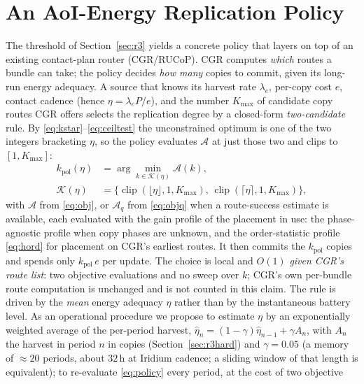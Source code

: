 \documentclass[twocolumn,3p,times,procedia]{elsarticle}
\theoremstyle{plain}
\theoremstyle{remark}
\begin{document}
\section{An AoI-Energy Replication Policy}\label{sec:policy}
The threshold of Section~\ref{sec:r3} yields a concrete policy that layers
on top of an existing contact-plan router (CGR/RUCoP). CGR computes
\emph{which} routes a bundle can take; the policy decides \emph{how many}
copies to commit, given its long-run energy adequacy. A source that knows its
harvest rate $\lambda_e$, per-copy cost $e$, contact cadence (hence
$\eta=\lambda_e P/e$), and the number $K_{\max}$ of candidate copy
routes CGR offers selects the replication degree by a closed-form
\emph{two-candidate} rule. By \eqref{eq:kstar}--\eqref{eq:ceiltest} the
unconstrained optimum is one of the two integers bracketing $\eta$, so the
policy
evaluates $\mathcal{A}$ at just those two and clips to $[1,K_{\max}]$:
\begin{equation}\label{eq:policy}
\begin{aligned}
k_{\mathrm{pol}}(\eta)&=\arg\min_{k\in\mathcal{K}(\eta)}\mathcal{A}(k),\\
\mathcal{K}(\eta)&=\bigl\{\operatorname{clip}(\lfloor\eta\rfloor,1,K_{\max}),\,
  \operatorname{clip}(\lceil\eta\rceil,1,K_{\max})\bigr\},
\end{aligned}
\end{equation}
with $\mathcal{A}$ from \eqref{eq:obj}, or $\mathcal{A}_q$ from
\eqref{eq:objq} when a route-success estimate is available, each
evaluated with the gain profile of the placement in use: the
phase-agnostic profile when copy phases are unknown, and the
order-statistic profile \eqref{eq:hord} for placement on CGR's
earliest routes. It then
commits the $k_{\mathrm{pol}}$ copies and spends only
$k_{\mathrm{pol}}\,e$ per update. The choice is local and $O(1)$
\emph{given CGR's route list}: two objective evaluations and no sweep
over $k$; CGR's own per-bundle route computation is unchanged and is
not counted in this claim. The rule is driven by the \emph{mean} energy
adequacy $\eta$ rather than by the instantaneous battery level. As an
operational procedure we propose to estimate $\eta$ by an exponentially
weighted average of the per-period harvest,
$\hat\eta_n=(1-\gamma)\hat\eta_{n-1}+\gamma A_n$, with $A_n$ the harvest
in period $n$ in copies (Section~\ref{sec:r3hard}) and $\gamma=0.05$ (a
memory of ${\approx}20$ periods, about $32$\,h at Iridium cadence; a
sliding window of that length is equivalent); to re-evaluate
\eqref{eq:policy} every period, at the cost of two objective
\end{document}
